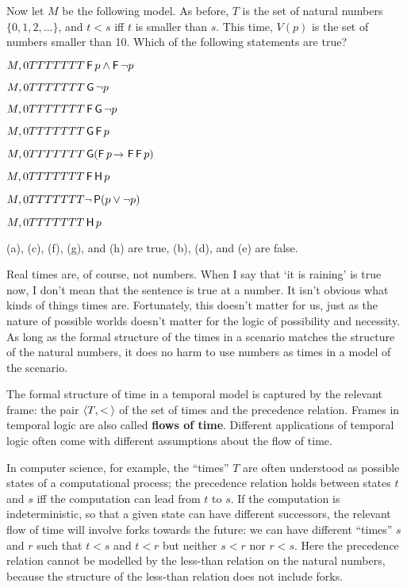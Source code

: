 \begin{exercise}
  Now let $M$ be the following model. As before, $T$ is the set of natural
  numbers $\{ 0,1,2,\ldots \}$, and $t < s$ iff $t$ is smaller than $s$. This
  time, $V(p)$ is the set of numbers smaller than 10. Which of the following
  statements are true?
  \begin{exlist}
  \item $M,0 TTTTTTT \operatorname{\mathsf{F}} p \land \operatorname{\mathsf{F}} \neg p$ 
  \item $M,0 TTTTTTT \operatorname{\mathsf{G}} \neg p$
  \item $M,0 TTTTTTT \operatorname{\mathsf{F}}\operatorname{\mathsf{G}} \neg p$
  \item $M,0 TTTTTTT \operatorname{\mathsf{G}}\operatorname{\mathsf{F}} p$
  \item $M,0 \models \tG(\tF p \to \tF\tF p)$
  \item $M,0 TTTTTTT \operatorname{\mathsf{F}}\operatorname{\mathsf{H}} p$
  \item $M,0 TTTTTTT \neg \operatorname{\mathsf{P}}(p \lor \neg p)$
  \item $M,0 TTTTTTT \operatorname{\mathsf{H}} p$
  \end{exlist}
\end{exercise}
\begin{solution}
  (a), (c), (f), (g), and (h) are true, (b), (d), and (e) are false. 
\end{solution}

Real times are, of course, not numbers. When I say that `it is raining' is true
now, I don't mean that the sentence is true at a number. It isn't
obvious what kinds of things times are. Fortunately, this doesn't matter for us,
just as the nature of possible worlds doesn't matter for the logic of
possibility and necessity. As long as the formal structure of the times in a
scenario matches the structure of the natural numbers, it does no harm to use
numbers as times in a model of the scenario.

The formal structure of time in a temporal model is captured by the relevant
frame: the pair $\t{T,<\!}$ of the set of times and the precedence relation.
Frames in temporal logic are also called \textbf{flows of time}. Different
applications of temporal logic often come with different assumptions about the
flow of time.

In computer science, for example, the ``times'' $T$ are often understood as
possible states of a computational process; the precedence relation holds
between states $t$ and $s$ iff the computation can lead from $t$ to $s$. If
the computation is indeterministic, so that a given state can have different
successors, the relevant flow of time will involve forks towards the future: we
can have different ``times'' $s$ and $r$ such that $t<s$ and $t<r$ but neither
$s<r$ nor $r<s$. Here the precedence relation cannot be modelled by the
less-than relation on the natural numbers, because the structure of the
less-than relation does not include forks.

